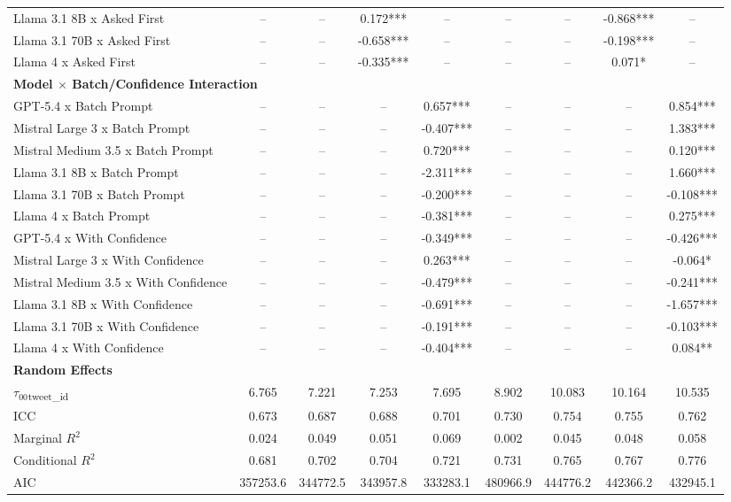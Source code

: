 \documentclass{article}
\begin{document}
\begin{table}
{\begin{tabular}{lcccccccc}
Llama 3.1 8B x Asked First & -- & -- & 0.172*** & -- & -- & -- & -0.868*** & -- \\
Llama 3.1 70B x Asked First & -- & -- & -0.658*** & -- & -- & -- & -0.198*** & -- \\
Llama 4 x Asked First & -- & -- & -0.335*** & -- & -- & -- & 0.071* & -- \\
\multicolumn{9}{l}{\textbf{Model $\times$ Batch/Confidence Interaction}} \\
GPT-5.4 x Batch Prompt & -- & -- & -- & 0.657*** & -- & -- & -- & 0.854*** \\
Mistral Large 3 x Batch Prompt & -- & -- & -- & -0.407*** & -- & -- & -- & 1.383*** \\
Mistral Medium 3.5 x Batch Prompt & -- & -- & -- & 0.720*** & -- & -- & -- & 0.120*** \\
Llama 3.1 8B x Batch Prompt & -- & -- & -- & -2.311*** & -- & -- & -- & 1.660*** \\
Llama 3.1 70B x Batch Prompt & -- & -- & -- & -0.200*** & -- & -- & -- & -0.108*** \\
Llama 4 x Batch Prompt & -- & -- & -- & -0.381*** & -- & -- & -- & 0.275*** \\
GPT-5.4 x With Confidence & -- & -- & -- & -0.349*** & -- & -- & -- & -0.426*** \\
Mistral Large 3 x With Confidence & -- & -- & -- & 0.263*** & -- & -- & -- & -0.064* \\
Mistral Medium 3.5 x With Confidence & -- & -- & -- & -0.479*** & -- & -- & -- & -0.241*** \\
Llama 3.1 8B x With Confidence & -- & -- & -- & -0.691*** & -- & -- & -- & -1.657*** \\
Llama 3.1 70B x With Confidence & -- & -- & -- & -0.191*** & -- & -- & -- & -0.103*** \\
Llama 4 x With Confidence & -- & -- & -- & -0.404*** & -- & -- & -- & 0.084** \\
\multicolumn{9}{l}{\textbf{Random Effects}} \\
$\tau_{00}$\textsubscript{tweet\_id} & 6.765 & 7.221 & 7.253 & 7.695 & 8.902 & 10.083 & 10.164 & 10.535 \\
\midrule
ICC & 0.673 & 0.687 & 0.688 & 0.701 & 0.730 & 0.754 & 0.755 & 0.762 \\
Marginal $R^2$ & 0.024 & 0.049 & 0.051 & 0.069 & 0.002 & 0.045 & 0.048 & 0.058 \\
Conditional $R^2$ & 0.681 & 0.702 & 0.704 & 0.721 & 0.731 & 0.765 & 0.767 & 0.776 \\
AIC & 357253.6 & 344772.5 & 343957.8 & 333283.1 & 480966.9 & 444776.2 & 442366.2 & 432945.1 \\

\end{tabular}}
\end{table}
\end{document}
